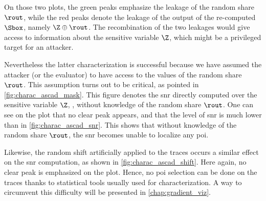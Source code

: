 On those two plots, the green peaks emphasize the leakage of the random share \(\rout\), while the red peaks denote the leakage of the output of the re-computed \(\Sbox\), namely \(\Z \oplus \rout\).
The recombination of the two leakages would give access to information about the sensitive variable \(\Z\), which might be a privileged target for an attacker.

Nevertheless the latter characterization is successful because we have assumed the attacker (or the evaluator) to have access to the values of the random share \(\rout\).
This assumption turns out to be critical, as pointed in \autoref{fig:charac_ascad_mask}.
This figure denotes the \gls{snr} directly computed over the sensitive variable \(\Z\), \ie{}, without knowledge of the random share \(\rout\).
One can see on the plot that no clear peak appears, and that the level of \gls{snr} is much lower than in \autoref{fig:charac_ascad_snr}.
This shows that without knowledge of the random share \(\rout\), the \gls{snr} becomes unable to localize any \gls{poi}.

Likewise, the random shift artificially applied to the traces occurs a similar effect on the \gls{snr} computation, as shown in \autoref{fig:charac_ascad_shift}.
Here again, no clear peak is emphasized on the plot.
Hence, no \gls{poi} selection can be done on the traces thanks to statistical tools usually used for characterization.
A way to circumvent this difficulty will be presented in \autoref{chap:gradient_viz}.

